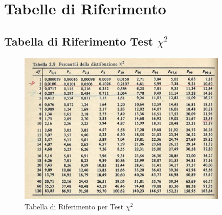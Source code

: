 \section{Tabelle di Riferimento}

\subsection{Tabella di Riferimento Test \texorpdfstring{$\chi^2$}{chi quadro}}\label{tabella-chiquadro}
\begin{figure}[H]
    \centering
    \includegraphics[width=10cm, keepaspectratio]{capitoli/goodnes_of_fit/imgs/chiquadro.png}
    \caption{Tabella di Riferimento per Test $\chi^2$}
    \label{chiquadro-tabella}
\end{figure}

